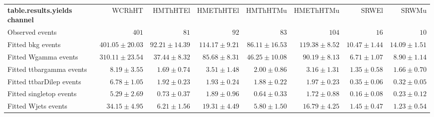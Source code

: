

\begin{table}
\begin{center}
\setlength{\tabcolsep}{0.0pc}
{\small
\begin{tabular*}{\textwidth}{@{\extracolsep{\fill}}lrrrrrrr}
\noalign{\smallskip}\hline\noalign{\smallskip}
{\bf table.results.yields channel}           & WCRhHT            & HMThHTEl            & HMEThHTEl            & HMThHTMu            & HMEThHTMu            & SRWEl            & SRWMu              \\[-0.05cm]
\noalign{\smallskip}\hline\noalign{\smallskip}
Observed events          & $401$              & $81$              & $92$              & $83$              & $104$              & $16$              & $10$                    \\
\noalign{\smallskip}\hline\noalign{\smallskip}
Fitted bkg events         & $401.05 \pm 20.03$          & $92.21 \pm 14.39$          & $114.17 \pm 9.21$          & $86.11 \pm 16.53$          & $119.38 \pm 8.52$          & $10.47 \pm 1.44$          & $14.09 \pm 1.51$              \\
\noalign{\smallskip}\hline\noalign{\smallskip}
        Fitted Wgamma events         & $310.11 \pm 23.54$          & $37.44 \pm 8.32$          & $85.68 \pm 8.31$          & $46.25 \pm 10.08$          & $90.19 \pm 8.13$          & $6.71 \pm 1.07$          & $8.90 \pm 1.14$              \\
        Fitted ttbargamma events         & $8.19 \pm 3.55$          & $1.69 \pm 0.74$          & $3.51 \pm 1.48$          & $2.00 \pm 0.86$          & $3.16 \pm 1.31$          & $1.35 \pm 0.58$          & $1.66 \pm 0.70$              \\
        Fitted ttbarDilep events         & $6.78 \pm 1.05$          & $1.92 \pm 0.23$          & $1.93 \pm 0.24$          & $1.88 \pm 0.22$          & $1.97 \pm 0.23$          & $0.35 \pm 0.06$          & $0.32 \pm 0.05$              \\
        Fitted singletop events         & $5.29 \pm 2.69$          & $0.73 \pm 0.37$          & $1.89 \pm 0.96$          & $0.64 \pm 0.33$          & $1.72 \pm 0.88$          & $0.16 \pm 0.08$          & $0.23 \pm 0.12$              \\
        Fitted Wjets events         & $34.15 \pm 4.95$          & $6.21 \pm 1.56$          & $19.31 \pm 4.49$          & $5.80 \pm 1.50$          & $16.79 \pm 4.25$          & $1.45 \pm 0.47$          & $1.23 \pm 0.54$              \\

\end{tabular*}}
\end{center}
\end{table}
